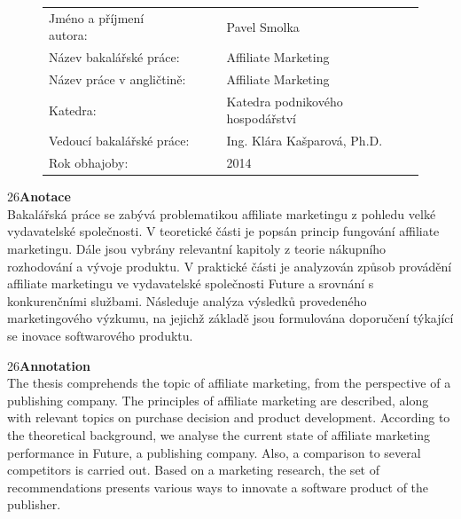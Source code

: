 \documentclass[12pt,twoside,openany]{fithesis}
\begin{document}

\FrontMatter %
\ThesisTitlePage %
\clearpage          




     \begin{figure}[h!]	
\begin{tabular}{l l }\vspace{1mm}
Jméno a příjmení autora:~~~~~	& Pavel Smolka	\\ \vspace{1mm}
Název bakalářské práce:	&	Affiliate Marketing\\ \vspace{1mm}
Název práce v angličtině:	&	Affiliate Marketing\\ \vspace{1mm}
Katedra:	&   Katedra podnikového hospodářství	\\ \vspace{1mm}
Vedoucí bakalářské práce:	&	Ing. Klára Kašparová, Ph.D.	\\ \vspace{1mm}
Rok obhajoby:	&	2014 \\
\end{tabular}
\end{figure}

\vspace{10mm}

\fontsize{18} {26}\textbf{Anotace}
\vspace{3mm} 
\\Bakalářská práce se zabývá problematikou affiliate marketingu z
pohledu velké vydavatelské společnosti. V teoretické části je
popsán princip fungování affiliate marketingu. Dále jsou
vybrány relevantní kapitoly z teorie nákupního rozhodování a
vývoje produktu. V praktické části je analyzován způsob
provádění affiliate marketingu ve vydavatelské společnosti
Future a srovnání s konkurenčními službami. Následuje analýza
výsledků provedeného marketingového výzkumu, na jejichž základě
jsou formulována doporučení týkající se inovace softwarového
produktu.
                                                            
\vspace{5mm}
\fontsize{18} {26}\textbf{Annotation}
\vspace{3mm}
\\The thesis comprehends the topic of affiliate marketing, from
the perspective of a publishing company. The principles of
affiliate marketing are described, along with relevant topics
on purchase decision and product development. According to the
theoretical background, we analyse the current state of
affiliate marketing performance in Future, a publishing
company. Also, a comparison to several competitors is carried
out. Based on a marketing research, the set of recommendations
presents various ways to innovate a software product of the
publisher.
\end{document}
